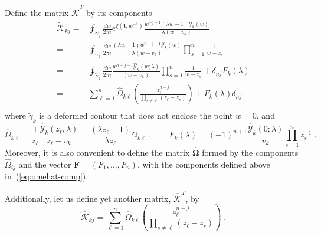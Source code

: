 \documentclass[a4paper,11pt]{amsart}
\begin{document}
Define the matrix \(\widetilde{\bm{\mathcal{K}}}^T\) by its components
\begin{equation}
\label{eq:k-tilde}
  \begin{split}
    \widetilde{\mathcal{K}}_{kj} = &
\oint_{\gamma_k} \frac{dw}{2\pi i} e^{\xi(\bm{t}, w^{-1})} \frac{w^{- j -1} ( \lambda w - 1) \mathcal{Y}_k(w)}{\lambda(w - v_k)}
    \\
    = & \oint_{\gamma_k} \frac{dw}{2\pi i}  
    \frac{( \lambda w - 1) w^{n-j-1}\mathcal{Y}_k(w)}{\lambda(w - v_k)} \prod_{s=1}^n \frac{1}{w - z_s}  \\
    = &
    \oint_{\tilde \gamma_k} \frac{dw}{2\pi i}
    \frac{w^{n-j-1}\widehat{\mathcal{Y}}_k(w; \lambda)}{(w - v_k)} \prod_{s=1}^n \frac{1}{w - z_s} 
    + \delta_{nj} F_k(\lambda) \\
    = & \sum_{\ell = 1}^n  \widehat{\Omega}_{k \ell} \left( \frac{z_\ell^{n-j}}{\prod_{s\neq \ell} (z_\ell - z_s)} \right)
    + F_k(\lambda)\delta_{nj}  \\
  \end{split}
\end{equation}
where \(\tilde{\gamma}_k\) is a deformed contour that does not enclose
the point \(w = 0\), and
\begin{equation}
\label{eq:omehat-comp}
  \widehat{\Omega}_{k\ell}
  = \frac{1}{z_\ell} \frac{\widehat{\mathcal{Y}}_k(z_\ell, \lambda)}{z_\ell - v_k}
  = \frac{(\lambda z_\ell -1)}{\lambda z_\ell} {\Omega}_{k\ell} 
\; , \qquad 
 F_k(\lambda) = (-1)^{n+1} \frac{\widehat{\mathcal{Y}}_k(0; \lambda)}{v_k }  \prod_{s=1}^n z_s^{-1} \; .
\end{equation}
Moreover, it is also convenient to define the matrix
\(\widehat{\bm{\Omega}}\) formed by the components
\(\widehat{\Omega}_{ij}\) and
the vector \(\bm{F} = (F_1, \dots , F_n)\), 
with the components defined above in~(\ref{eq:omehat-comp}).

Additionally, let us define yet another matrix,
\(\widehat{\bm{\mathcal{K}}}^T\), by
\begin{equation}
    \widehat{\mathcal{K}}_{kj} = 
    \sum_{\ell = 1}^n  \widehat{\Omega}_{k \ell}
    \left( \frac{z_\ell^{n-j}}{\prod_{s\neq \ell} (z_\ell - z_s)} \right) \; .
\end{equation}
\end{document}
